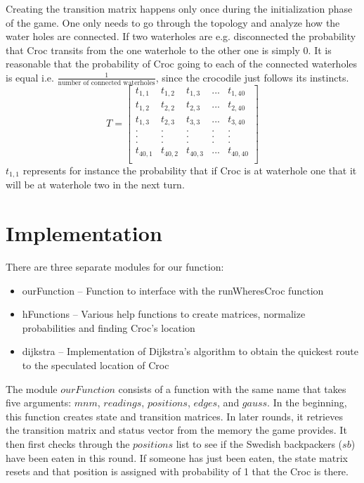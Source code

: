 \documentclass[a4paper]{article}
\begin{document}
Creating the transition matrix happens only once during the initialization phase of the game. One only needs to go through the topology and analyze how the water holes are connected. If two waterholes are e.g. disconnected the probability that Croc transits from the one waterhole to the other one is simply \ensuremath{0}. It is reasonable that the probability of Croc going to each of the connected waterholes is equal i.e. \ensuremath{\frac{1}{\text{number of connected waterholes}}}, since the crocodile just follows its instincts.  
\begin{equation}
T = \begin{bmatrix}
       t_{1,1}	& t_{1,2} 	& t_{1,3} 	& ... 	& t_{1,40}	\\
       t_{1,2} 	& t_{2,2} 	& t_{2,3} 	& ... 	& t_{2,40}	\\
       t_{1,3} 	& t_{2,3}	& t_{3,3} 	& ... 	& t_{3,40} 	\\
	   . 		& .  		& .       	& .   	& . 		\\
       . 		& .  		& .       	& .   	& . 		\\
       . 		& .  		& .      	& .   	& . 		\\
       t_{40,1} & t_{40,2} 	& t_{40,3}  & ... 	& t_{40,40}	\\
     \end{bmatrix}
\end{equation}
\ensuremath{t_{1,1}} represents for instance the probability that if Croc is at waterhole one that it will be at waterhole two in the next turn. 
 
\section{Implementation}
There are three separate modules for our function:
\begin{itemize}
\item ourFunction -- Function to interface with the runWheresCroc function
\item hFunctions -- Various help functions to create matrices, normalize probabilities and finding Croc's location
\item dijkstra -- Implementation of Dijkstra's algorithm to obtain the quickest route to the speculated location of Croc
\end{itemize}

The module $ourFunction$ consists of a function with the same name that takes five arguments: $mnm$, $readings$, $positions$, $edges$, and $gauss$. In the beginning, this function creates state and transition matrices. In later rounds, it retrieves the transition matrix and status vector from the memory the game provides. It then first checks through the $positions$ list to see if the Swedish backpackers ($sb$) have been eaten in this round. If someone has just been eaten, the state matrix resets and that position is assigned with probability of 1 that the Croc is there.
\end{document}
